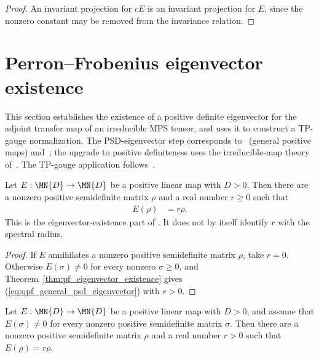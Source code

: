 \begin{proof}\leanok
    An invariant projection for $cE$ is an invariant projection
    for $E$, since the nonzero constant may be removed from the invariance
    relation.
\end{proof}

\section{Perron--Frobenius eigenvector existence}%
\label{sec:pf_eigenvector}

This section establishes the existence of a positive definite
eigenvector for the adjoint transfer map of an irreducible MPS
tensor, and uses it to construct a TP-gauge normalization.
The PSD-eigenvector step corresponds to~\cite[Theorem~6.5]{Wolf2012Quantum}
(general positive maps) and~\cite{Evans1978Spectral}; the upgrade to positive
definiteness uses the irreducible-map theory of~\cite[Theorem~6.3]{Wolf2012Quantum}.
The TP-gauge application follows~\cite[Appendix~A]{Cirac2016MPDO_arXiv}.

\begin{theorem}
    \label{thm:pf_eigenvector_existence_general}
    \leanok
    Let $E:\MN{D}\to\MN{D}$ be a positive linear map with $D>0$. Then
    there are a nonzero positive semidefinite matrix $\rho$ and a real number
    $r\geq0$ such that
    \begin{align}
        E(\rho)
         & =r\rho.
        \label{eq:qpf_general_psd_eigenvector}
    \end{align}
    This is the eigenvector-existence part of
    \cite[Theorem~6.5]{Wolf2012Quantum}. It does not by itself identify $r$
    with the spectral radius.
\end{theorem}

\begin{proof}\leanok
    If $E$ annihilates a nonzero positive semidefinite matrix $\rho$, take
    $r=0$. Otherwise $E(\sigma)\neq0$ for every nonzero
    $\sigma\geq0$, and Theorem~\ref{thm:pf_eigenvector_existence} gives
    (\ref{eq:qpf_general_psd_eigenvector}) with $r>0$.
\end{proof}

\begin{theorem}
    \label{thm:pf_eigenvector_existence}
    \leanok
    Let $E:\MN{D}\to\MN{D}$ be a positive linear map with $D>0$, and assume
    that $E(\sigma)\neq0$ for every nonzero positive semidefinite matrix
    $\sigma$. Then there are a nonzero positive semidefinite matrix $\rho$
    and a real number $r>0$ such that $E(\rho)=r\rho$.
\end{theorem}


